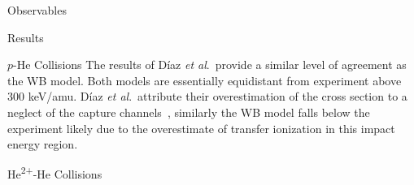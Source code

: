 \documentclass[letterpaper, 11 pt]{report}
\begin{document}
\begin{chapter}{Observables \label{chap:p-he2p-he}}
\begin{section}{Results \label{sec:phe2p-res}}
\begin{subsection}{\texorpdfstring{$p$}{p}-He Collisions \label{sec:phe-res}}
         The results of D\'{i}az \textit{et al}.\ provide a similar level of agreement as the WB model.
         Both models are essentially equidistant from experiment above 300 keV/amu. D\'{i}az
         \textit{et al}.\ attribute their overestimation of the cross section to a neglect of the
         capture channels~\cite{DMS-00}, similarly the WB model falls below the experiment likely due to
         the overestimate of transfer ionization in this impact energy region.

      \end{subsection}

      \begin{subsection}{\texorpdfstring{He\textsuperscript{2+}}{He2+}-He Collisions 
                         \label{sec:he2phe-res}}

         \begin{figure}[ht]
            \begin{minipage}{.49\linewidth}
               

\end{minipage}
\end{figure}
\end{subsection}
\end{section}
\end{chapter}
\end{document}
